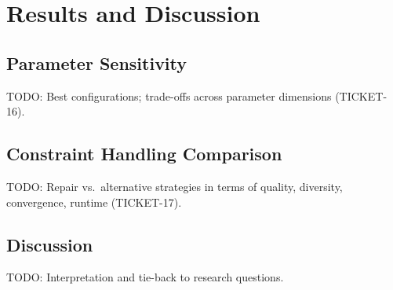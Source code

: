 \chapter{Results and Discussion}
\label{Chapter6}

\section{Parameter Sensitivity}
\label{Sec:Sensitivity}
TODO: Best configurations; trade-offs across parameter dimensions (TICKET-16).

\section{Constraint Handling Comparison}
\label{Sec:Comparison}
TODO: Repair vs.\ alternative strategies in terms of quality, diversity, convergence, runtime (TICKET-17).

\section{Discussion}
\label{Sec:Discussion}
TODO: Interpretation and tie-back to research questions.
